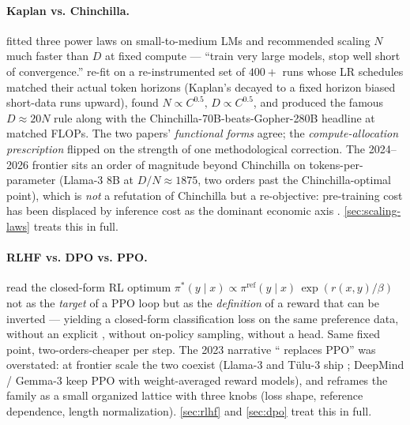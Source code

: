 \paragraph{Kaplan vs. Chinchilla.} \citet{kaplan2020} fitted three
power laws on small-to-medium  LMs and recommended scaling
$N$ much faster than $D$ at fixed compute --- ``train very large models,
stop well short of convergence.'' \citet{hoffmann2022-chinchilla}
re-fit on a re-instrumented set of $400+$ runs whose LR schedules
matched their actual token horizons (Kaplan's  decayed
to a fixed horizon biased short-data runs upward), found
$N \propto C^{0.5},\, D \propto C^{0.5}$, and produced the famous
$D \approx 20N$ rule along with the Chinchilla-70B-beats-Gopher-280B
headline at matched FLOPs. The two papers' \emph{functional forms}
agree; the \emph{compute-allocation prescription} flipped on the
strength of one methodological correction. The 2024--2026 frontier
sits an order of magnitude beyond Chinchilla on tokens-per-parameter
(Llama-3 8B at $D/N \approx 1875$, two orders past the
Chinchilla-optimal point), which is \emph{not} a refutation of
Chinchilla but a re-objective: pre-training cost has been displaced by
inference cost as the dominant economic axis
\citep[\S 3.2]{deepseek-v3}. \cref{sec:scaling-laws} treats this
in full.

\paragraph{RLHF vs. DPO vs. PPO.} \citet{rafailov2023-dpo} read the
 closed-form RL optimum
$\pi^*(y \mid x) \propto \pi^{\mathrm{ref}}(y \mid x)\,\exp(r(x,y)/\beta)$
not as the \emph{target} of a PPO loop \citep{ouyang2022-instructgpt}
but as the \emph{definition} of a reward that can be inverted ---
yielding a closed-form classification loss on the same preference data,
without an explicit , without on-policy sampling, without
a  head. Same fixed point, two-orders-cheaper per step. The 2023
narrative `` replaces PPO'' was overstated: at frontier scale the
two coexist (Llama-3 and T\"ulu-3 ship ; DeepMind / Gemma-3 keep
PPO with weight-averaged reward models), and \citet{meng2024-simpo}
reframes the  family as a small organized lattice with three
knobs (loss shape, reference dependence, length normalization).
\cref{sec:rlhf} and \cref{sec:dpo} treat this in full.

